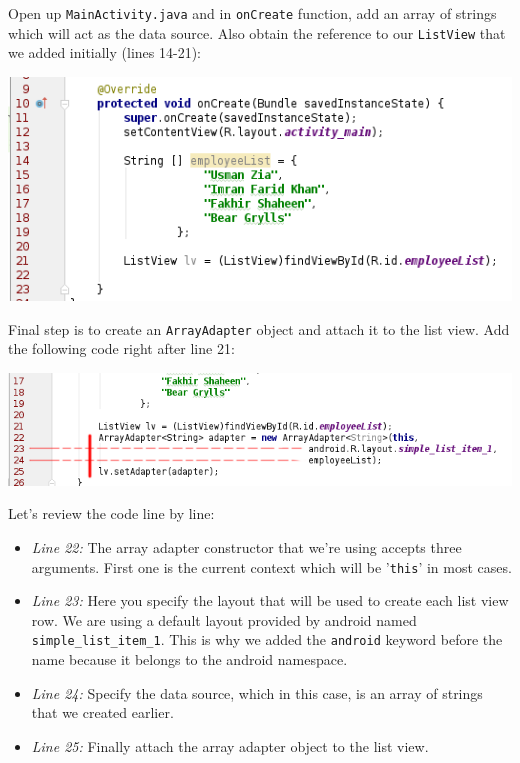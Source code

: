 Open up \texttt{MainActivity.java} and in \texttt{onCreate} function, add an array of strings which will act as the data source. Also obtain the reference to our \texttt{ListView} that we added initially (lines 14-21):

\begin{center}
	\includegraphics[scale=0.4]{chapters/ch10/images/8}
\end{center}

Final step is to create an \texttt{ArrayAdapter} object and attach it to the list view. Add the following code right after line 21:

\begin{center}
	\includegraphics[scale=0.4]{chapters/ch10/images/9}
\end{center}

Let's review the code line by line:

\begin{itemize}
	\item \textit{Line 22:} The array adapter constructor that we're using accepts three arguments. First one is the current context which will be '\texttt{this}' in most cases.
	
	\item \textit{Line 23:} Here you specify the layout that will be used to create each list view row. We are using a default layout provided by android named \texttt{simple\_list\_item\_1}. This is why we added the \texttt{android} keyword before the name because it belongs to the android namespace.
	
	\item \textit{Line 24:} Specify the data source, which in this case, is an array of strings that we created earlier.
	
	\item \textit{Line 25:}  Finally attach the array adapter object to the list view.
\end{itemize}

